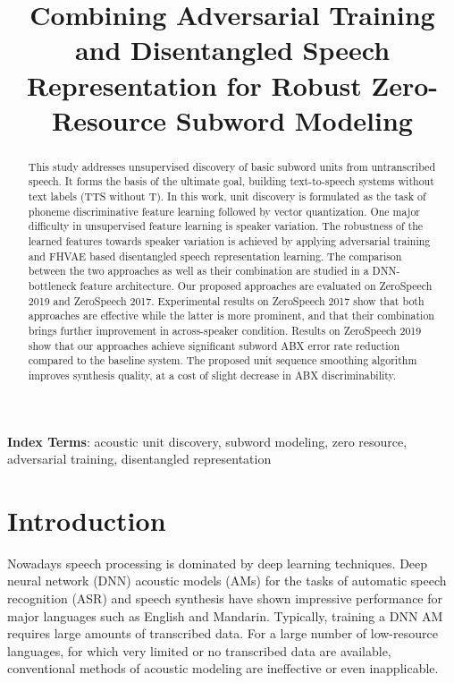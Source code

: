 \documentclass[a4paper]{article}
\title{Combining Adversarial Training and  Disentangled Speech Representation  for Robust Zero-Resource Subword Modeling}
\begin{document}
\maketitle
% 
\begin{abstract}
This study addresses unsupervised discovery of basic subword units from untranscribed speech. It forms the basis of the ultimate goal, building text-to-speech  systems without  text labels (TTS without T). In this work,  unit discovery  is formulated  as the task of phoneme discriminative feature learning followed by vector quantization.  
One major difficulty in unsupervised feature learning is speaker variation. The robustness of the learned features towards speaker variation is achieved by applying adversarial training and FHVAE based disentangled speech representation learning. The comparison between the two approaches as well as their combination are studied in a DNN-bottleneck feature architecture. Our proposed approaches are evaluated on ZeroSpeech 2019 and ZeroSpeech 2017.
Experimental results on ZeroSpeech 2017 show that both approaches are effective while the latter is more prominent, and that their combination brings further improvement in across-speaker condition. Results on ZeroSpeech 2019 show that our approaches achieve significant subword ABX error rate reduction compared to the baseline system. The proposed unit sequence smoothing algorithm improves synthesis quality, at a cost of slight decrease in ABX discriminability.

\end{abstract}
\noindent\textbf{Index Terms}: acoustic unit discovery, subword modeling, zero resource, adversarial training, disentangled representation


\section{Introduction}
\label{sec:intro}
Nowadays speech processing is dominated by deep learning techniques. Deep neural network (DNN) acoustic models (AMs) for the tasks of  automatic speech recognition (ASR) and speech synthesis have shown impressive performance for major languages such as English and Mandarin. Typically, training a DNN AM requires large amounts of transcribed data. For a large number of low-resource languages, for which very limited or no transcribed data are available, conventional methods of acoustic modeling are ineffective or even inapplicable.
\end{document}
